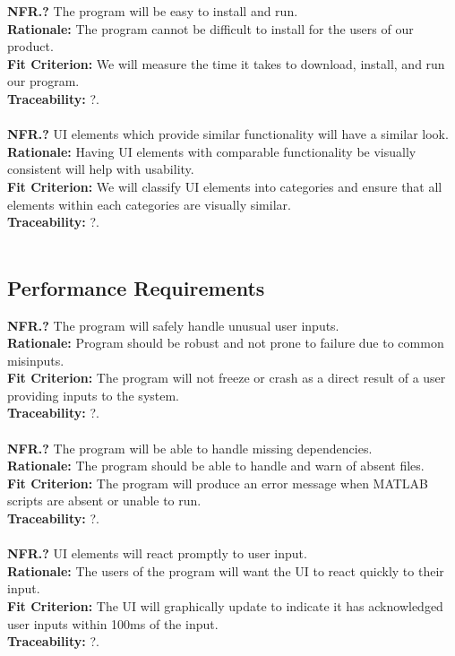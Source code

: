 \documentclass[12pt]{article}
\begin{document}
  \noindent\textbf{NFR.?} The program will be easy to install and run.\\
  \textbf{Rationale:} The program cannot be difficult to install for the users of our product.\\
  \textbf{Fit Criterion:} We will measure the time it takes to download, install, and run our program.\\
  \textbf{Traceability:} ?.\\\\

  \noindent\textbf{NFR.?} UI elements which provide similar functionality will have a similar look.\\
  \textbf{Rationale:} Having UI elements with comparable functionality be visually consistent will help with usability.\\
  \textbf{Fit Criterion:} We will classify UI elements into categories and ensure that all elements within each categories are visually similar.\\
  \textbf{Traceability:} ?.\\\\

\subsection{Performance Requirements}

  \textbf{NFR.?} The program will safely handle unusual user inputs.\\
  \textbf{Rationale:} Program should be robust and not prone to failure due to common misinputs.\\
  \textbf{Fit Criterion:} The program will not freeze or crash as a direct result of a user providing inputs to the system.\\
  \textbf{Traceability:} ?.\\\\

  \noindent\textbf{NFR.?} The program will be able to handle missing dependencies.\\
  \textbf{Rationale:} The program should be able to handle and warn of absent files.\\
  \textbf{Fit Criterion:} The program will produce an error message when MATLAB scripts are absent or unable to run.\\
  \textbf{Traceability:} ?.\\\\

  \noindent\textbf{NFR.?} UI elements will react promptly to user input.\\
  \textbf{Rationale:} The users of the program will want the UI to react quickly to their input.\\
  \textbf{Fit Criterion:} The UI will graphically update to indicate it has acknowledged user inputs within 100ms of the input.\\
  \textbf{Traceability:} ?.\\\\
\end{document}
